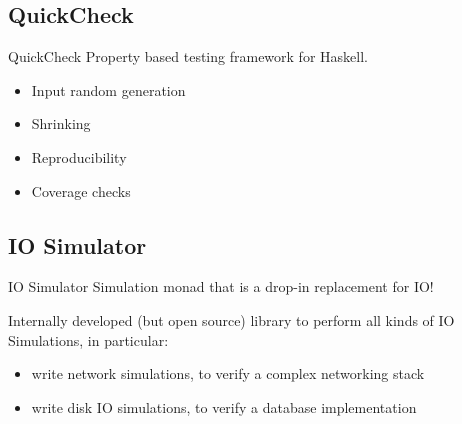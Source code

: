 \documentclass{beamer}
\begin{document}
\subsection*{QuickCheck}

\begin{frame}{QuickCheck}
  Property based testing framework for Haskell.

  \begin{itemize}
    \item \alert{Input random generation}
    \item Shrinking
    \item \alert{Reproducibility}
    \item Coverage checks
  \end{itemize}

\end{frame}

\subsection*{IO Simulator}
\begin{frame}{IO Simulator}
  Simulation monad that is a drop-in \alert{replacement} for IO!

  Internally developed (but open source) library to perform all kinds of IO
  Simulations, in particular:

  \begin{itemize}
    \item write \alert{network simulations}, to verify a complex networking stack
    \item write {disk IO simulations}, to verify a database implementation
  \end{itemize}
\end{frame}
\end{document}
